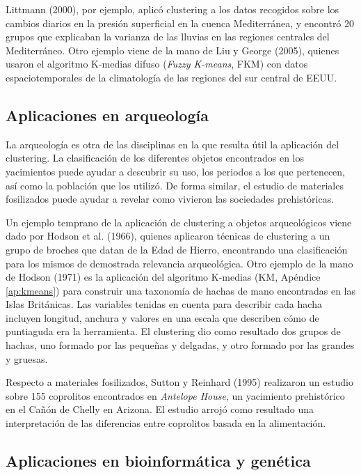 Littmann (2000), por ejemplo, aplicó clustering a los datos recogidos sobre los cambios diarios en la presión superficial en la cuenca Mediterránea, y encontró 20 grupos que explicaban la varianza de las lluvias en las regiones centrales del Mediterráneo. Otro ejemplo viene de la mano de Liu y George (2005), quienes usaron el algoritmo K-medias difuso (\textit{Fuzzy K-means}, \acs{FKM}) con datos espaciotemporales de la climatología de las regiones del sur central de EEUU. 

\subsection{Aplicaciones en arqueología}

La arqueología es otra de las disciplinas en la que resulta útil la aplicación del clustering. La clasificación de los diferentes objetos encontrados en los yacimientos puede ayudar a descubrir su uso, los periodos a los que pertenecen, así como la población que los utilizó. De forma similar, el estudio de materiales fosilizados puede ayudar a revelar como vivieron las sociedades prehistóricas. 

Un ejemplo temprano de la aplicación de clustering a objetos arqueológicos viene dado por Hodson et al. (1966), quienes aplicaron técnicas de clustering a un grupo de broches que datan de la Edad de Hierro, encontrando una clasificación para los mismos de demostrada relevancia arqueológica. Otro ejemplo de la mano de Hodson (1971) es la aplicación del algoritmo K-medias (\acs{KM}, Apéndice \ref{ap:kmeans}) para construir una taxonomía de hachas de mano encontradas en las Islas Británicas. Las variables tenidas en cuenta para describir cada hacha incluyen longitud, anchura y valores en una escala que describen cómo de puntiaguda era la herramienta. El clustering dio como resultado dos grupos de hachas, uno formado por las pequeñas y delgadas, y otro formado por las grandes y gruesas.

Respecto a materiales fosilizados, Sutton y Reinhard (1995) realizaron un estudio sobre 155 coprolitos encontrados en \textit{Antelope House}, un yacimiento prehistórico en el Cañón de Chelly en Arizona. El estudio arrojó como resultado una interpretación de las diferencias entre coprolitos basada en la alimentación.

\subsection{Aplicaciones en bioinformática y genética}

